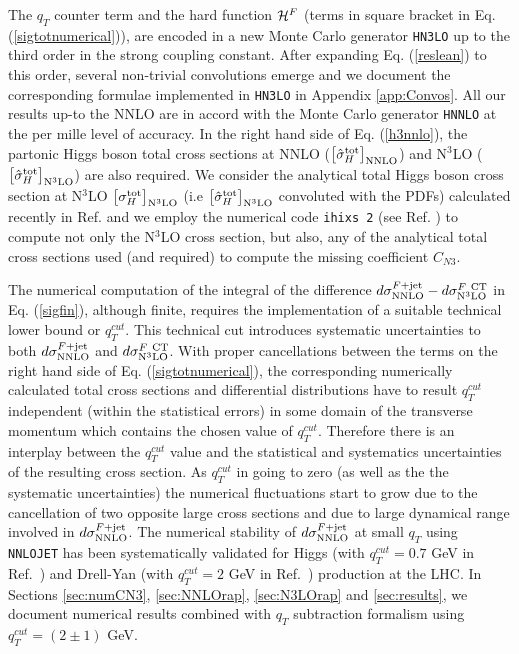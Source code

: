 \documentclass[12pt]{article}
\def\qt{q_T}
\begin{document}
The $q_T$ counter term and the hard function ${\cal H}^F$ (terms in square bracket in Eq. (\ref{sigtotnumerical})), are encoded in a new Monte Carlo generator \texttt{HN3LO} up to the third order in the strong coupling constant. After expanding Eq. (\ref{reslean}) to this order, several non-trivial convolutions emerge and we document the corresponding formulae implemented in \texttt{HN3LO} in Appendix \ref{app:Convos}. All our results up-to the NNLO are in accord with the Monte Carlo generator \texttt{HNNLO} \cite{Catani:2007vq} at the per mille level of accuracy. In the right hand side of Eq.  (\ref{h3nnlo}), the partonic Higgs boson total cross sections at NNLO ($\bigl[ {\hat \sigma}_{H}^{{\rm {tot}}} \bigr]_{\rm NNLO}$) and N$^{3}$LO  ($\bigl[ {\hat \sigma}_{H}^{{\rm {tot}}} \bigr]_{\rm N^{3}LO}$) are also required. We consider the analytical total Higgs boson cross section at N$^{3}$LO $\bigl[  \sigma_{H}^{{\rm {tot}}} \bigr]_{\rm N^{3}LO}$ (i.e $\bigl[ {\hat \sigma}_{H}^{{\rm {tot}}} \bigr]_{\rm N^{3}LO}$ convoluted with the PDFs)  calculated recently in Ref. \cite{Mistlberger:2018etf} and we employ the numerical code \texttt{ihixs 2} (see Ref. \cite{Dulat:2018rbf}) to compute not only the N$^{3}$LO cross section, but also, any of the analytical total cross sections used (and required) to compute the missing coefficient $C_{N3}$.

The numerical computation of the integral of the difference $d{\sigma}_{\rm{NNLO}}^{F+{\rm jet}}-d{\sigma}_{\rm{N}^3\rm{LO}}^{F {\rm\ CT}}$ in Eq. (\ref{sigfin}), although finite, requires the implementation of a suitable technical lower bound or $q_T^{cut}$. This technical cut introduces systematic uncertainties to both $d{\sigma}_{\rm{NNLO}}^{F+{\rm jet}}$ and $d{\sigma}_{\rm{N}^3\rm{LO}}^{F {\rm\ CT}}$. With proper cancellations between the terms on the right hand side of Eq. (\ref{sigtotnumerical}), the corresponding numerically calculated total cross sections and differential distributions have to result $q_T^{cut}$ independent (within the statistical errors) in some domain of the transverse momentum which contains the chosen value of $q_T^{cut}$. Therefore there is an interplay between the $q_T^{cut}$ value and the statistical and systematics uncertainties of the resulting cross section. As $q_T^{cut}$ in going to zero (as well as the the systematic uncertainties) the numerical fluctuations start to grow due to the cancellation of two opposite large cross sections and due to large dynamical range involved in $d{\sigma}_{\rm{NNLO}}^{F+{\rm jet}}$. The numerical stability of $d{\sigma}_{\rm{NNLO}}^{F+{\rm jet}}$ at small $q_T$ using \texttt{NNLOJET} has been systematically validated for Higgs (with $q_T^{cut}=0.7$ GeV in Ref.~\cite{Chen:2018pzu}) and Drell-Yan (with $q_T^{cut}=2$ GeV in Ref.~\cite{Bizon:2018foh}) production at the LHC. In Sections \ref{sec:numCN3}, \ref{sec:NNLOrap}, \ref{sec:N3LOrap} and \ref{sec:results}, we document numerical results combined with $\qt$ subtraction formalism using $q_T^{cut}=(2\pm 1)$ GeV.
\end{document}
